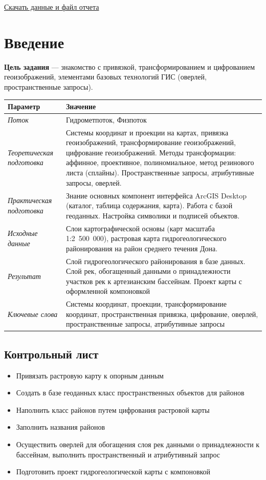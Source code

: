 \documentclass[12pt,]{book}
\providecommand{\tightlist}{%
  \setlength{\itemsep}{0pt}\setlength{\parskip}{0pt}}
\begin{document}
\href{http://autolab.geogr.msu.ru/gis/data/Ex06.zip}{Скачать данные и файл отчета}

\hypertarget{map-ref-hydrogeologic-intro}{%
\section{Введение}\label{map-ref-hydrogeologic-intro}}

\textbf{Цель задания} --- знакомство с привязкой, трансформированием и цифрованием геоизображений, элементами базовых технологий ГИС (оверлей, пространственные запросы).

\begin{longtable}[]{@{}ll@{}}
\toprule
Параметр & Значение\tabularnewline
\midrule
\endhead
\emph{Поток} & Гидрометпоток, Физпоток\tabularnewline
\emph{Теоретическая подготовка} & Системы координат и проекции на картах, привязка геоизображений, трансформирование геоизображений, цифрование геоизображений. Методы трансформации: аффинное, проективное, полиномиальное, метод резинового листа (сплайны). Пространственные запросы, атрибутивные запросы, оверлей.\tabularnewline
\emph{Практическая подготовка} & Знание основных компонент интерфейса ArcGIS Desktop (каталог, таблица содержания, карта). Работа с базой геоданных. Настройка символики и подписей объектов.\tabularnewline
\emph{Исходные данные} & Слои картографической основы (карт масштаба 1:2~500~000), растровая карта гидрогеологического районирования на район среднего течения Дона.\tabularnewline
\emph{Результат} & Слой гидрогеологического районирования в базе данных. Слой рек, обогащенный данными о принадлежности участков рек к артезианским бассейнам. Проект карты с оформленной компоновкой\tabularnewline
\emph{Ключевые слова} & Системы координат, проекции, трансформирование координат, пространственная привязка, цифрование, оверлей, пространственные запросы, атрибутивные запросы\tabularnewline
\bottomrule
\end{longtable}

\hypertarget{map-ref-hydrogeologic-control}{%
\subsection{Контрольный лист}\label{map-ref-hydrogeologic-control}}

\begin{itemize}
\tightlist
\item
  Привязать растровую карту к опорным данным
\item
  Создать в базе геоданных класс пространственных объектов для районов
\item
  Наполнить класс районов путем цифрования растровой карты
\item
  Заполнить названия районов
\item
  Осуществить оверлей для обогащения слоя рек данными о принадлежности к бассейнам, выполнить пространственный и атрибутивный запрос
\item
  Подготовить проект гидрогеологической карты с компоновкой
\end{itemize}
\end{document}
